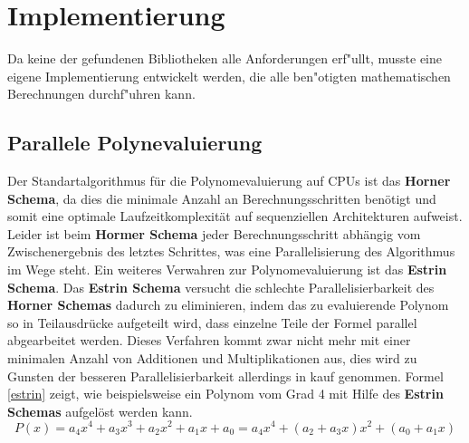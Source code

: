 \section{Implementierung}

Da keine der gefundenen Bibliotheken alle Anforderungen erf"ullt, musste eine eigene Implementierung entwickelt werden, die alle ben"otigten mathematischen Berechnungen durchf"uhren kann.

\subsection{Parallele Polynevaluierung}
Der Standartalgorithmus für die Polynomevaluierung auf CPUs ist das \textbf{Horner Schema}, da dies die minimale Anzahl an Berechnungsschritten benötigt und somit eine optimale Laufzeitkomplexität auf sequenziellen Architekturen aufweist. Leider ist beim \textbf{Hormer Schema} jeder Berechnungsschritt abhängig vom Zwischenergebnis des letztes Schrittes, was eine Parallelisierung des Algorithmus im Wege steht.\newline
Ein weiteres Verwahren zur Polynomevaluierung ist das \textbf{Estrin Schema}. Das \textbf{Estrin Schema} versucht die schlechte Parallelisierbarkeit des \textbf{Horner Schemas} dadurch zu eliminieren, indem das zu evaluierende Polynom so in Teilausdrücke aufgeteilt wird, dass einzelne Teile der Formel parallel abgearbeitet werden. Dieses Verfahren kommt zwar nicht mehr mit einer minimalen Anzahl von Additionen und Multiplikationen aus, dies wird zu Gunsten der besseren Parallelisierbarkeit allerdings in kauf genommen.\newline
Formel \eqref{estrin} zeigt, wie beispielsweise ein Polynom vom Grad 4 mit Hilfe des \textbf{Estrin Schemas} aufgelöst werden kann.
\begin{equation}\label{estrin}
P(x) = a_4x^4 + a_3x^3 + a_2x^2 + a_1x + a_0 = a_4x^4 + (a_2+a_3x)x^2 + (a_0+a_1x)
\end{equation}

